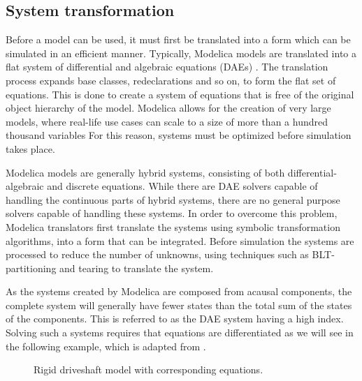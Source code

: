 \documentclass[\rootfolder/main.tex]{subfiles}
\begin{document}
\subsection{System transformation}

Before a model can be used, it must first be translated into a form which can be simulated in an efficient manner.
Typically, Modelica models are translated into a flat system of differential and algebraic equations (DAEs) \cite{openmodelica.org:lundvall:sims:2005}.
The translation process expands base classes, redeclarations and so on, to form the flat set of equations.
This is done to create a system of equations that is free of the original object hierarchy of the model.
Modelica allows for the creation of very large models, where real-life use cases can scale to a size of more than a hundred thousand variables
For this reason, systems must be optimized before simulation takes place.

Modelica models are generally hybrid systems, consisting of both differential-algebraic and discrete equations.
While there are DAE solvers capable of handling the continuous parts of hybrid systems, there are no general purpose solvers capable of handling these systems.
In order to overcome this problem, Modelica translators first translate the systems using symbolic transformation algorithms, into a form that can be integrated.
Before simulation the systems are processed to reduce the number of unknowns, using techniques such as BLT-partitioning and tearing \cite{clauss2002} to translate the system.

As the systems created by Modelica are composed from acausal components, the complete system will generally have fewer states than the total sum of the states of the components.
This is referred to as the DAE system having a high index.
Solving such a systems requires that equations are differentiated as we will see in the following example, which is adapted from \cite{clauss2002}.

\begin{figure}[ht]
	\begin{minipage}[c]{.75\columnwidth}
	\end{minipage}%
	\begin{minipage}[c]{.25\columnwidth}
	\end{minipage}
    \caption{Rigid driveshaft model with corresponding equations.}
\end{figure}
\end{document}
